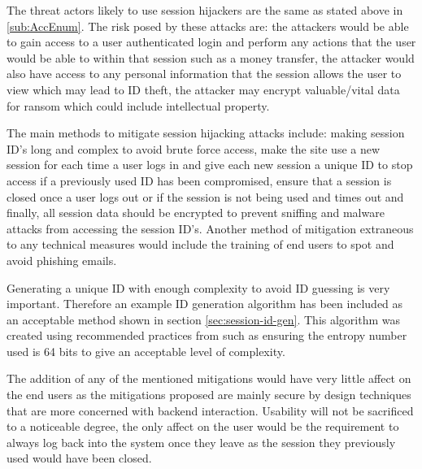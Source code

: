 \documentclass{ueacmpstyle}
\begin{document}
      The threat actors likely to use session hijackers are the same as stated above 
      in \ref{sub:AccEnum}. The risk posed by these attacks are: the attackers would 
      be able to gain access to a user authenticated login and perform any actions that the 
      user would be able to within that session such as a money transfer, the attacker would 
      also have access to any personal information that the session allows the user to view 
      which may lead to ID theft, the attacker may encrypt valuable/vital data for ransom 
      which could include intellectual property.

      The main methods to mitigate session hijacking attacks include: making session ID's 
      long and complex to avoid brute force access, make the site use a new session for 
      each time a user logs in and give each new session a unique ID to stop access if a 
      previously used ID has been compromised, ensure that a session is closed once a user 
      logs out or if the session is not being used and times out and finally, all session 
      data should be encrypted to prevent sniffing and malware attacks from accessing the 
      session ID's. Another method of mitigation extraneous to any technical measures 
      would include the training of end users to spot and avoid phishing emails.

      Generating a unique ID with enough complexity to avoid ID guessing is very important. 
      Therefore an example ID generation algorithm has been included as an acceptable 
      method shown in section \ref{sec:session-id-gen}. This algorithm was created using 
      recommended practices from \cite{OWASPSessionManagement} such as ensuring the entropy 
      number used is 64 bits to give an acceptable level of complexity.

      The addition of any of the mentioned mitigations would have very little affect on 
      the end users as the mitigations proposed are mainly secure by design techniques 
      that are more concerned with backend interaction. Usability will not be sacrificed 
      to a noticeable degree, the only affect on the user would be the requirement to 
      always log back into the system once they leave as the session they previously used 
      would have been closed.
\end{document}
